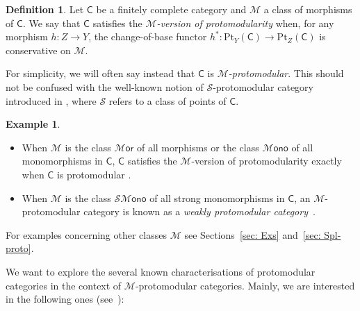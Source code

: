 \documentclass[11pt]{amsart}
\theoremstyle{plain}
\theoremstyle{definition}
\newtheorem{definition}[subsection]{Definition}
\newtheorem{example}[subsection]{Example}
\theoremstyle{remark}
\newcommand{\defn}[1]{\emph{#1}}
\newcommand{\C}{\ensuremath{\mathsf{C}}}
\newcommand{\Pt}{\ensuremath{\mathrm{Pt}}}
\newcommand{\M}{\ensuremath{\mathscr{M}}}
\newcommand{\Sscr}{\ensuremath{\mathscr{S}}}
\newcommand{\Mor}{\ensuremath{\mathscr{M}\mathsf{or}}}
\newcommand{\Mono}{\ensuremath{\mathscr{M}\mathsf{ono}}}
\newcommand{\SMono}{\ensuremath{\mathscr{SM}\mathsf{ono}}}
\begin{document}
\begin{definition}\label{def: M-proto}
Let $\C$ be a finitely complete category and $\M$ a class of morphisms of $\C$. We say that $\C$ satisfies the \defn{$\M$-version of protomodularity} when, for any morphism $h\colon Z\to Y$, the change-of-base functor $h^*\colon \Pt_Y(\C)\to \Pt_Z(\C)$ is conservative on $\M$.
\end{definition}
For simplicity, we will often say instead that $\C$ is \defn{$\M$-protomodular}. This should not be confused with the well-known notion of $\Sscr$-protomodular category introduced in \cite{BMFMS}, where $\Sscr$ refers to a class of points of $\C$.

\begin{example}\label{ex: M-proto cats}
\begin{itemize}
	\item[1.] %
When $\M$ is the class $\Mor$ of all morphisms or the class $\Mono$ of all monomorphisms in $\C$, $\C$ satisfies the $\M$-version of protomodularity exactly when $\C$ is protomodular \cite{NEKEAC}.
	\item[2.] When $\M$ is the class $\SMono$ of all strong monomorphisms in $\C$, an $\M$-protomodular category is known as a \emph{weakly protomodular category}~\cite{CM-FM}.
\end{itemize}
	\item[3.] For examples concerning other classes $\M$ see Sections~\ref{sec: Exs} and~\ref{sec: Spl-proto}.
\end{example}

We want to explore the several known characterisations of protomodular categories in the context of $\M$-protomodular categories. Mainly, we are interested in the following ones (see~\cite{NEKEAC,BB}):
\end{document}
